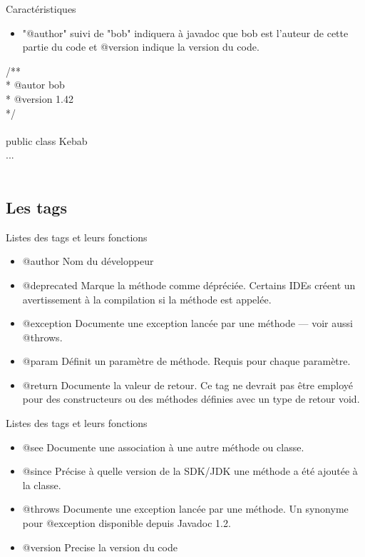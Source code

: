 \documentclass{beamer}
\begin{document}
\begin{frame}{Caractéristiques}
\begin{itemize}
\item {
    "@author" suivi de "bob" indiquera à javadoc que bob est
    l'auteur de cette partie du code et @version indique la version du code.
}
\end{itemize}
\begin{example}
    /** \\
    * @autor bob\\
    * @version 1.42\\
    */\\
    \\
    public class Kebab \\
    ...\\
    \\
\end{example}
\end{frame}

\subsection{Les tags}
\begin{frame}{Listes des tags et leurs fonctions}
 \begin{itemize}
  \item {
    @author Nom du développeur  
}
      \item {
@deprecated Marque la méthode comme dépréciée. Certains IDEs créent un avertissement à la compilation si la méthode est appelée.    
}
      \item {
@exception 	Documente une exception lancée par une méthode — voir aussi @throws.    
}
      \item {
@param 	Définit un paramètre de méthode. Requis pour chaque paramètre.    
}
      \item {
@return Documente la valeur de retour. Ce tag ne devrait pas être employé pour des constructeurs ou des méthodes définies avec un type de retour void.    
}

  \end{itemize}
\end{frame}




\begin{frame}{Listes des tags et leurs fonctions}
 \begin{itemize}
      \item {
@see Documente une association à une autre méthode ou classe.
}
          \item {
@since 	Précise à quelle version de la SDK/JDK une méthode a été ajoutée à la classe.  
}
          \item {
@throws	Documente une exception lancée par une méthode. Un synonyme pour @exception disponible depuis Javadoc 1.2.
}
          \item {
@version Precise la version du code
}
  \end{itemize}
\end{frame}
\end{document}
